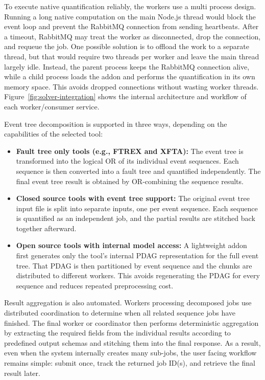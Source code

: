 To execute native quantification reliably, the workers use a multi process design. Running a long native computation on the main Node.js thread would block the event loop and prevent the RabbitMQ connection from sending heartbeats. After a timeout, RabbitMQ may treat the worker as disconnected, drop the connection, and requeue the job. One possible solution is to offload the work to a separate thread, but that would require two threads per worker and leave the main thread largely idle. Instead, the parent process keeps the RabbitMQ connection alive, while a child process loads the addon and performs the quantification in its own memory space. This avoids dropped connections without wasting worker threads. Figure~\ref{fig:solver-integration} shows the internal architecture and workflow of each worker/consumer service.



Event tree decomposition is supported in three ways, depending on the capabilities of the selected tool:
\begin{itemize}
    \item \textbf{Fault tree only tools (e.g., FTREX and XFTA):} The event tree is transformed into the logical OR of its individual event sequences. Each sequence is then converted into a fault tree and quantified independently. The final event tree result is obtained by OR-combining the sequence results.
    \item \textbf{Closed source tools with event tree support:} The original event tree input file is split into separate inputs, one per event sequence. Each sequence is quantified as an independent job, and the partial results are stitched back together afterward.
    \item \textbf{Open source tools with internal model access:} A lightweight addon first generates only the tool's internal PDAG representation for the full event tree. That PDAG is then partitioned by event sequence and the chunks are distributed to different workers. This avoids regenerating the PDAG for every sequence and reduces repeated preprocessing cost.
\end{itemize}

Result aggregation is also automated. Workers processing decomposed jobs use distributed coordination to determine when all related sequence jobs have finished. The final worker or coordinator then performs deterministic aggregation by extracting the required fields from the individual results according to predefined output schemas and stitching them into the final response. As a result, even when the system internally creates many sub-jobs, the user facing workflow remains simple: submit once, track the returned job ID(s), and retrieve the final result later.

